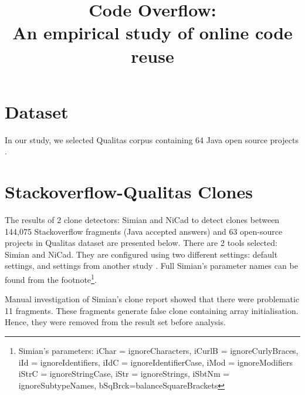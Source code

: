\documentclass{IEEEtran}
\begin{document}
\onecolumn

\title{Code Overflow: \\
	An empirical study of online code reuse}
\maketitle

\section*{Dataset}
In our study, we selected Qualitas corpus containing 64 Java open source projects \cite{Qualitas}.

\section*{Stackoverflow-Qualitas Clones}
The results of 2 clone detectors: Simian and NiCad to detect clones between 144,075 Stackoverflow fragments (Java accepted answers) and 63 open-source projects in Qualitas dataset are presented below. There are 2 tools selected: Simian and NiCad. They are configured using two different settings: default settings, and settings from another study \cite{Wang2013}. Full Simian's parameter names can be found from the footnote\footnote{Simian's parameters: iChar = ignoreCharacters, iCurlB = ignoreCurlyBraces, iId = ignoreIdentifiers, iIdC = ignoreIdentifierCase, iMod = ignoreModifiers \newline iStrC = ignoreStringCase, iStr = ignoreStrings, iSbtNm = ignoreSubtypeNames, bSqBrck=balanceSquareBrackets}. 

Manual investigation of Simian's clone report showed that there were problematic 11 fragments. These fragments generate false clone containing array initialisation. Hence, they were removed from the result set before analysis.
\end{document}
